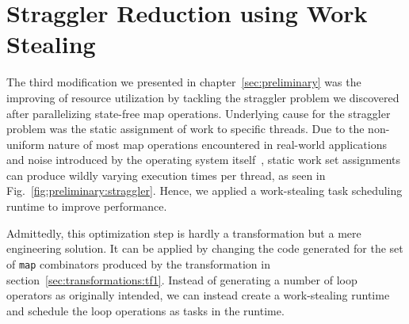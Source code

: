 \section{Straggler Reduction using Work Stealing}%
\label{sec:transformations:tf3}

The third modification we presented in chapter~\ref{sec:preliminary} was the improving of resource utilization by tackling the straggler problem we discovered after parallelizing state-free map operations.
Underlying cause for the straggler problem was the static assignment of work to specific threads.
Due to the non-uniform nature of most map operations encountered in real-world applications and noise introduced by the operating system itself~\cite{lackorzynski2016decoupled}, static work set assignments can produce wildly varying execution times per thread, as seen in Fig.~\ref{fig:preliminary:straggler}.
Hence, we applied a work-stealing task scheduling runtime to improve performance.

Admittedly, this optimization step is hardly a transformation but a mere engineering solution.
It can be applied by changing the code generated for the set of \texttt{map} combinators produced by the transformation in section~\ref{sec:transformations:tf1}.
Instead of generating a number of loop operators as originally intended, we can instead create a work-stealing runtime and schedule the loop operations as tasks in the runtime.






